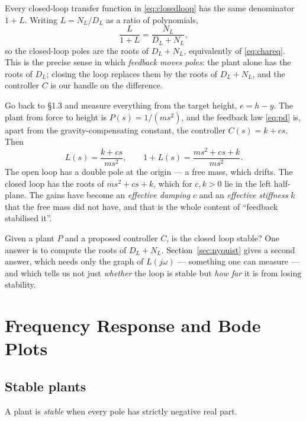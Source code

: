 \documentclass[11pt]{article}
\begin{document}
Every closed-loop transfer function in \eqref{eq:closedloop} has the same
denominator $1+L$. Writing $L=N_L/D_L$ as a ratio of polynomials,
\[
   \frac{L}{1+L} = \frac{N_L}{D_L+N_L},
\]
so the closed-loop poles are the roots of $D_L+N_L$, equivalently of
\eqref{eq:chareq}. This is the precise sense in which \emph{feedback moves poles}:
the plant alone has the roots of $D_L$; closing the loop replaces them by the
roots of $D_L+N_L$, and the controller $C$ is our handle on the difference.

\begin{example}\label{ex:massloop}
Go back to \S1.3 and measure everything from the target height, $e=h-y$. The
plant from force to height is $P(s)=1/(ms^{2})$, and the feedback law
\eqref{eq:pd} is, apart from the gravity-compensating constant, the controller
$C(s)=k+cs$. Then
\[
   L(s) = \frac{k+cs}{ms^{2}},
   \qquad
   1+L(s) = \frac{ms^{2}+cs+k}{ms^{2}} .
\]
The open loop has a double pole at the origin --- a free mass, which drifts. The
closed loop has the roots of $ms^{2}+cs+k$, which for $c,k>0$ lie in the left
half-plane. The gains have become an \emph{effective damping} $c$ and an
\emph{effective stiffness} $k$ that the free mass did not have, and that is the
whole content of ``feedback stabilised it''.
\end{example}

\begin{question}
Given a plant $P$ and a proposed controller $C$, is the closed loop stable? One
answer is to compute the roots of $D_L+N_L$. Section~\ref{sec:nyquist} gives a
second answer, which needs only the graph of $L(j\omega)$ --- something one can
measure --- and which tells us not just \emph{whether} the loop is stable but
\emph{how far} it is from losing stability.
\end{question}


\section{Frequency Response and Bode Plots}\label{sec:freq}

\subsection{Stable plants}
\begin{definition}\label{def:stable}
A plant is \emph{stable} when every pole has strictly negative real part.
\end{definition}
\end{document}
